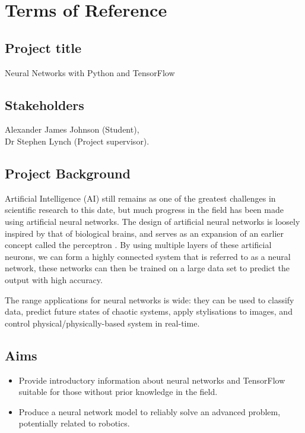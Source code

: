 \chapter*{Terms of Reference}

\section*{Project title}
Neural Networks with Python and TensorFlow

\section*{Stakeholders}
Alexander James Johnson (Student),\\
Dr Stephen Lynch (Project supervisor).

\section*{Project Background}
Artificial Intelligence (AI) still remains as one of the greatest challenges in
scientific research to this date, but much progress in the field has been made
using artificial neural networks.
The design of artificial neural networks is loosely inspired by that of
biological brains, and serves as an expansion of an earlier concept called the
perceptron \citep{Rosenblatt:1958:Perceptron}.
By using multiple layers of these artificial neurons, we can form a highly
connected system that is referred to as a neural network,
these networks can then be trained on a large data set to predict the output
with high accuracy.

The range applications for neural networks is wide: they can be used to classify
data, predict future states of chaotic systems, apply stylisations to images,
and control physical/physically-based system in real-time.

\section*{Aims}
\begin{itemize}
    \item Provide introductory information about neural networks and TensorFlow
        suitable for those without prior knowledge in the field.

    \item Produce a neural network model to reliably solve an advanced problem,
        potentially related to robotics.
\end{itemize}
\newpage
